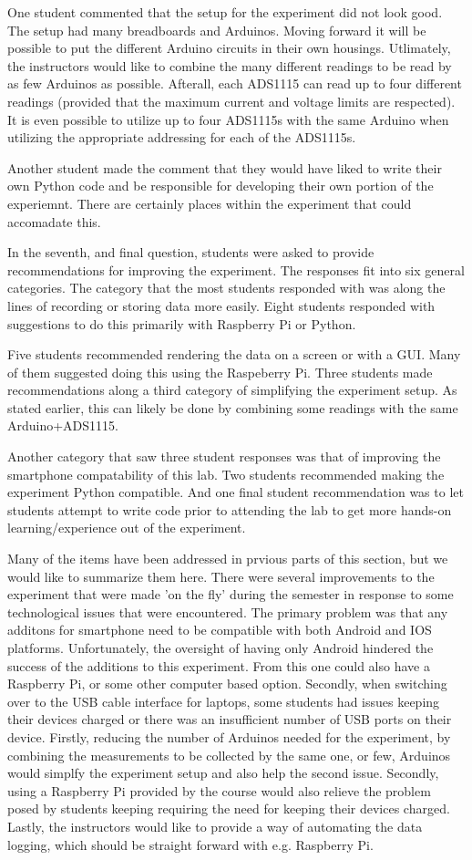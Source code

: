 One student commented that the setup for the experiment did not look good.
The setup had many breadboards and Arduinos.
Moving forward it will be possible to put the different Arduino circuits in their own housings.
Utlimately, the instructors would like to combine the many different readings to be read by as few Arduinos as possible.
Afterall, each ADS1115 can read up to four different readings (provided that the maximum current and voltage limits are respected).
It is even possible to utilize up to four ADS1115s with the same Arduino when utilizing the appropriate addressing for each of the ADS1115s.

Another student made the comment that they would have liked to write their own Python code and be responsible for developing their own portion of the experiemnt.
There are certainly places within the experiment that could accomadate this.

In the seventh, and final question, students were asked to provide recommendations for improving the experiment.
The responses fit into six general categories.
The category that the most students responded with was  along the lines of recording or storing data more easily.
Eight students responded with suggestions to do this primarily with Raspberry Pi or Python.

Five students recommended rendering the data on a screen or with a GUI.
Many of them suggested doing this using the Raspeberry Pi.
Three students made recommendations along a third category of simplifying the experiment setup.
As stated earlier, this can likely be done by combining some readings with the same Arduino+ADS1115.

Another category that saw three student responses was that of improving the smartphone compatability of this lab.
Two students recommended making the experiment Python compatible.
And one final student recommendation was to let students attempt to write code prior to attending the lab to get more hands-on learning/experience out of the experiment.

Many of the items have been addressed in prvious parts of this section, but we would like to summarize them here.
There were several improvements to the experiment that were made 'on the fly' during the semester in response to some technological issues that were encountered.
The primary problem was that any additons for smartphone need to be compatible with both Android and IOS platforms.
Unfortunately, the oversight of having only Android hindered the success of the additions to this experiment.
From this one could also have a Raspberry Pi, or some other computer based option.
Secondly, when switching over to the USB cable interface for laptops, some students had issues keeping their devices charged or there was an insufficient number of USB ports on their device.
Firstly, reducing the number of Arduinos needed for the experiment, by combining the measurements to be collected by the same one, or few, Arduinos would simplfy the experiment setup and also help the second issue.
Secondly, using a Raspberry Pi provided by the course would also relieve the problem posed by students keeping requiring the need for keeping their devices charged.
Lastly, the instructors would like to provide a way of automating the data logging, which should be straight forward with e.g. Raspberry Pi.
